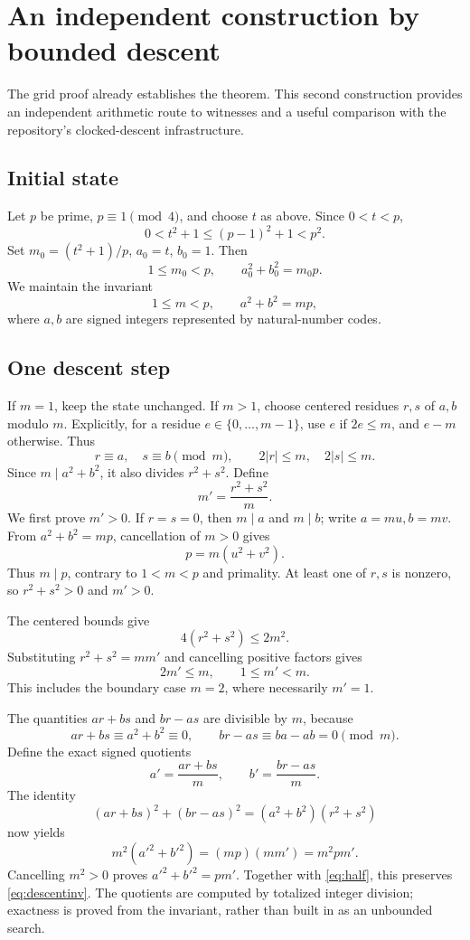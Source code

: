\documentclass[11pt,letterpaper]{article}
\theoremstyle{definition}
\theoremstyle{remark}
\newcommand{\abs}[1]{\lvert #1\rvert}
\begin{document}
\section{An independent construction by bounded descent}
\label{sec:descent}

The grid proof already establishes the theorem. This second construction
provides an independent arithmetic route to witnesses and a useful
comparison with the repository's clocked-descent infrastructure.

\subsection{Initial state}

Let \(p\) be prime, \(p\equiv1\pmod4\), and choose \(t\) as above.
Since \(0<t<p\),
\[
 0<t^2+1\le(p-1)^2+1<p^2.
\]
Set \(m_0=(t^2+1)/p\), \(a_0=t\), \(b_0=1\). Then
\[
 1\le m_0<p,\qquad a_0^2+b_0^2=m_0p.
\]
We maintain the invariant
\begin{equation}
 1\le m<p,\qquad a^2+b^2=mp,
 \label{eq:descentinv}
\end{equation}
where \(a,b\) are signed integers represented by natural-number codes.

\subsection{One descent step}

If \(m=1\), keep the state unchanged. If \(m>1\), choose centered
residues \(r,s\) of \(a,b\) modulo \(m\). Explicitly, for a residue
\(e\in\{0,\ldots,m-1\}\), use \(e\) if \(2e\le m\), and \(e-m\) otherwise.
Thus
\[
 r\equiv a,\quad s\equiv b\pmod m,\qquad
 2\abs r\le m,\quad 2\abs s\le m.
\]
Since \(m\mid a^2+b^2\), it also divides \(r^2+s^2\). Define
\[
 m'=\frac{r^2+s^2}{m}.
\]
We first prove \(m'>0\). If \(r=s=0\), then \(m\mid a\) and \(m\mid b\);
write \(a=mu,b=mv\). From \(a^2+b^2=mp\), cancellation of \(m>0\) gives
\[
 p=m(u^2+v^2).
\]
Thus \(m\mid p\), contrary to \(1<m<p\) and primality. At least one of
\(r,s\) is nonzero, so \(r^2+s^2>0\) and \(m'>0\).

The centered bounds give
\[
 4(r^2+s^2)\le2m^2.
\]
Substituting \(r^2+s^2=mm'\) and cancelling positive factors gives
\begin{equation}
 2m'\le m,\qquad 1\le m'<m.
 \label{eq:half}
\end{equation}
This includes the boundary case \(m=2\), where necessarily \(m'=1\).

The quantities \(ar+bs\) and \(br-as\) are divisible by \(m\), because
\[
 ar+bs\equiv a^2+b^2\equiv0,\qquad
 br-as\equiv ba-ab=0\pmod m.
\]
Define the exact signed quotients
\[
 a'=\frac{ar+bs}{m},\qquad b'=\frac{br-as}{m}.
\]
The identity
\[
 (ar+bs)^2+(br-as)^2=(a^2+b^2)(r^2+s^2)
\]
now yields
\[
 m^2(a'^2+b'^2)=(mp)(mm')=m^2pm'.
\]
Cancelling \(m^2>0\) proves \(a'^2+b'^2=pm'\).
Together with \eqref{eq:half}, this preserves \eqref{eq:descentinv}.
The quotients are computed by totalized integer division; exactness is
proved from the invariant, rather than built in as an unbounded search.
\end{document}
